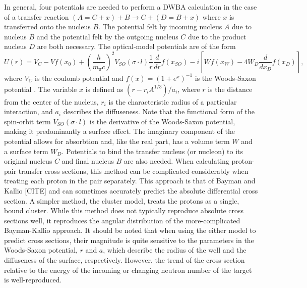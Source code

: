 In general, four potentials are needed to perform a DWBA calculation in the case of a transfer reaction $(A = C+x)+B\rightarrow C+(D = B+x)$ where $x$ is transferred onto the nucleus $B$.  The potential felt by incoming nucleus $A$ due to nucleus $B$ and the potential felt by the outgoing nucleus $C$ due to the product nucleus $D$ are both necessary.  The optical-model potentials are of the form
\begin{equation}
U(r) = V_C - Vf(x_0) + \left( \frac{h}{m_{\pi}c} \right) ^2 V_{SO}(\sigma\cdot l)\frac{1}{r}\frac{d}{dr}f(x_{SO})
-i[Wf(x_W) - 4W_D\frac{d}{dx_D}f(x_D)],
\end{equation}
where $V_C$ is the coulomb potential and $f(x)=(1+e^x)^{-1}$ is the Woods-Saxon potential \cite{PereyPerey}.  The variable $x$ is defined as $(r-r_iA^{1/3})/a_i$, where $r$ is the distance from the center of the nucleus, $r_i$ is the characteristic radius of a particular interaction, and $a_i$ describes the diffuseness.  Note that the functional form of the spin-orbit term $V_{SO}(\sigma\cdot l)$ is the derivative of the Woods-Saxon potential, making it predominantly a surface effect.  The imaginary component of the potential allows for absorbtion and, like the real part, has a volume term $W$ and a surface term $W_D$.  Potentials to bind the transfer nucleus (or nucleon) to its original nucleus $C$ and final nucleus $B$ are also needed. 
When calculating proton-pair transfer cross sections, this method can be complicated considerably when treating each proton in the pair separately.  This approach is that of Bayman and Kallio [CITE] and can sometimes accurately predict the absolute differential cross section.  A simpler method, the cluster model, treats the protons as a single, bound cluster.  While this method does not typically reproduce absolute cross sections well, it reproduces the angular distribution of the more-complicated Bayman-Kallio approach.  It should be noted that when using the either model to predict cross sections, their magnitude is quite sensitive to the parameters in the Woods-Saxon potential, $r$ and $a$, which describe the radius of the well and the diffuseness of the surface, respectively.  However, the trend of the cross-section relative to the energy of the incoming  or changing neutron number of the target is well-reproduced.

